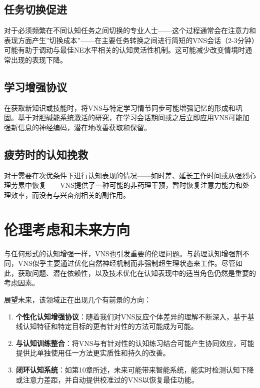 \documentclass[
  Letterpaper,
]{scrbook}
\begin{document}
\subsection{任务切换促进}\label{ux4efbux52a1ux5207ux6362ux4fc3ux8fdb}

对于必须频繁在不同认知任务之间切换的专业人士------这个过程通常会在注意力和表现方面产生''切换成本''------在主要任务转换之间进行简短的VNS会话（2-3分钟）可能有助于调动与最佳NE水平相关的认知灵活性机制。这可能减少改变情境时通常出现的表现下降。

\subsection{学习增强协议}\label{ux5b66ux4e60ux589eux5f3aux534fux8bae}

在获取新知识或技能时，将VNS与特定学习情节同步可能增强记忆的形成和巩固。基于对胆碱能系统激活的研究，在学习会话期间或之后立即应用VNS可能加强新信息的神经编码，潜在地改善获取和保留。

\subsection{疲劳时的认知挽救}\label{ux75b2ux52b3ux65f6ux7684ux8ba4ux77e5ux633dux6551}

对于需要在次优条件下进行认知表现的情况------如时差、延长工作时间或从强烈心理劳累中恢复------VNS提供了一种可能的非药理干预，暂时恢复注意力能力和处理效率，而没有与兴奋剂相关的副作用。

\section{伦理考虑和未来方向}\label{ux4f26ux7406ux8003ux8651ux548cux672aux6765ux65b9ux5411}

与任何形式的认知增强一样，VNS也引发重要的伦理问题。与药理认知增强剂不同，VNS似乎主要通过优化自然神经机制而非强制超生理状态来工作。尽管如此，获取问题、潜在依赖性，以及技术优化在认知表现中的适当角色仍然是重要的考虑因素。

展望未来，该领域正在出现几个有前景的方向：

\begin{enumerate}
\def\labelenumi{\arabic{enumi}.}
\item
  \textbf{个性化认知增强协议}：随着我们对VNS反应个体差异的理解不断深入，基于基线认知特征和特定目标的更有针对性的方法可能成为可能。
\item
  \textbf{与认知训练整合}：将VNS与有针对性的认知练习结合可能产生协同效应，可能提供比单独使用任一方法更实质性和持久的改善。
\item
  \textbf{闭环认知系统}：如第10章所述，未来可能带来智能系统，能实时检测认知下降或注意力差距，并自动提供校准过的VNS以恢复最佳功能。
\end{enumerate}
\end{document}
